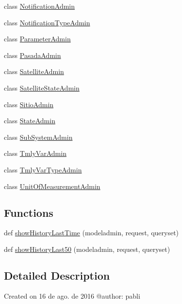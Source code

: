 \begin{DoxyCompactItemize}
\item 
class \hyperlink{class_ground_segment_1_1admin_1_1_notification_admin}{Notification\+Admin}
\item 
class \hyperlink{class_ground_segment_1_1admin_1_1_notification_type_admin}{Notification\+Type\+Admin}
\item 
class \hyperlink{class_ground_segment_1_1admin_1_1_parameter_admin}{Parameter\+Admin}
\item 
class \hyperlink{class_ground_segment_1_1admin_1_1_pasada_admin}{Pasada\+Admin}
\item 
class \hyperlink{class_ground_segment_1_1admin_1_1_satellite_admin}{Satellite\+Admin}
\item 
class \hyperlink{class_ground_segment_1_1admin_1_1_satellite_state_admin}{Satellite\+State\+Admin}
\item 
class \hyperlink{class_ground_segment_1_1admin_1_1_sitio_admin}{Sitio\+Admin}
\item 
class \hyperlink{class_ground_segment_1_1admin_1_1_state_admin}{State\+Admin}
\item 
class \hyperlink{class_ground_segment_1_1admin_1_1_sub_system_admin}{Sub\+System\+Admin}
\item 
class \hyperlink{class_ground_segment_1_1admin_1_1_tmly_var_admin}{Tmly\+Var\+Admin}
\item 
class \hyperlink{class_ground_segment_1_1admin_1_1_tmly_var_type_admin}{Tmly\+Var\+Type\+Admin}
\item 
class \hyperlink{class_ground_segment_1_1admin_1_1_unit_of_measurement_admin}{Unit\+Of\+Measurement\+Admin}
\end{DoxyCompactItemize}
\subsection*{Functions}
\begin{DoxyCompactItemize}
\item 
def \hyperlink{namespace_ground_segment_1_1admin_acedf79afa40e10477e21ec210f122733}{show\+History\+Last\+Time} (modeladmin, request, queryset)
\item 
def \hyperlink{namespace_ground_segment_1_1admin_a682b5d47d4b4131c8fb49180a2c702c4}{show\+History\+Last50} (modeladmin, request, queryset)
\end{DoxyCompactItemize}


\subsection{Detailed Description}
\begin{DoxyVerb}Created on 16 de ago. de 2016
@author: pabli
\end{DoxyVerb}
 

